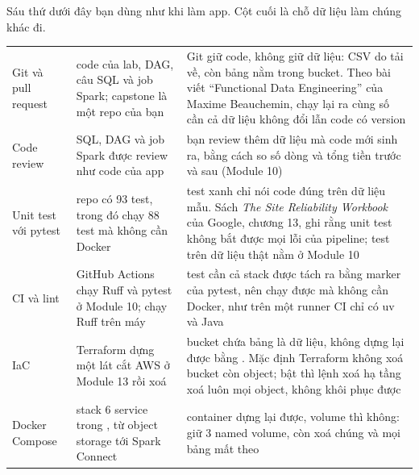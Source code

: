 Sáu thứ dưới đây bạn dùng như khi làm app. Cột cuối là chỗ dữ liệu làm chúng khác đi.
\begin{xltabular}{\textwidth}{@{}P{2.6cm} L L@{}}
\toprule
{} &  &  \\
\midrule
\endhead
\bottomrule
\endfoot
Git và pull request & code của lab, DAG, câu SQL và job Spark; capstone là một repo của bạn & Git giữ code, không giữ dữ liệu: CSV do  tải về, còn bảng nằm trong bucket. Theo bài viết ``Functional Data Engineering'' của Maxime Beauchemin, chạy lại ra cùng số cần cả dữ liệu không đổi lẫn code có version \\
Code review & SQL, DAG và job Spark được review như code của app & bạn review thêm dữ liệu mà code mới sinh ra, bằng cách so số dòng và tổng tiền trước và sau (Module 10) \\
Unit test với pytest & repo có 93 test, trong đó  chạy 88 test mà không cần Docker & test xanh chỉ nói code đúng trên dữ liệu mẫu. Sách \textit{The Site Reliability Workbook} của Google, chương 13, ghi rằng unit test không bắt được mọi lỗi của pipeline; test trên dữ liệu thật nằm ở Module 10 \\
CI và lint & GitHub Actions chạy Ruff và pytest ở Module 10;  chạy Ruff trên máy & test cần cả stack được tách ra bằng marker  của pytest, nên  chạy được mà không cần Docker, như trên một runner CI chỉ có uv và Java \\
IaC & Terraform dựng một lát cắt AWS ở Module 13 rồi xoá & bucket chứa bảng là dữ liệu, không dựng lại được bằng . Mặc định Terraform không xoá bucket còn object; bật  thì lệnh xoá hạ tầng xoá luôn mọi object, không khôi phục được \\
Docker Compose & stack 6 service trong , từ object storage tới Spark Connect & container dựng lại được, volume thì không:  giữ 3 named volume, còn  xoá chúng và mọi bảng mất theo \\
\end{xltabular}

